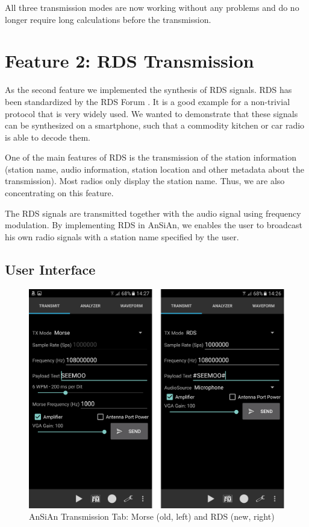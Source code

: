 All three transmission modes are now working without any problems and do no longer require long calculations before the transmission. 



\section{Feature 2: RDS Transmission}
\label{sec:impl:feature2}
As the second feature we implemented the synthesis of \ac{RDS} signals. \ac{RDS} has been standardized by the RDS Forum \cite{RDS1999}. It is a good example for a non-trivial protocol that is very widely used. We wanted to demonstrate that these signals can be synthesized on a smartphone, such that a commodity kitchen or car radio is able to decode them. 

One of the main features of RDS is the transmission of the station information (station name, audio information, station location and other metadata about the transmission). Most radios only display the station name. Thus, we are also concentrating on this feature. 

The RDS signals are transmitted together with the audio signal using frequency modulation. By implementing RDS in AnSiAn, we enables the user to broadcast his own radio signals with a station name specified by the user. 

\subsection{User Interface}
\begin{figure}[!htbp]
	\centering
	\includegraphics[width=1.0\linewidth]{gfx/screenshot_rds.png}
	\caption{AnSiAn Transmission Tab: Morse (old, left) and RDS (new, right)}
	\label{fig:impl:screenshotrds}
\end{figure}


